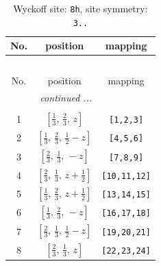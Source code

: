 \documentclass[fleqn,8pt]{jsarticle}
\begin{document}
\begin{longtable}{ccc}
\caption{Wyckoff site: {\tt 8h}, site symmetry: {\tt 3..}}
 \\
 \hline \hline
No. & position & mapping \\ \hline \endfirsthead

\multicolumn{2}{l}{\tablename\ \thetable{}} \\
 \hline \hline
No. & position & mapping \\ \hline \endhead

 \hline \hline
\multicolumn{2}{r}{\footnotesize\it continued ...} \\ \endfoot

 \hline \hline
\multicolumn{2}{r}{} \\ \endlastfoot

1 & $\left[ \frac{1}{3},\, \frac{2}{3},\, z \right]$ & {\tt [1,2,3]} \\ \hline
2 & $\left[ \frac{1}{3},\, \frac{2}{3},\, \frac{1}{2} - z \right]$ & {\tt [4,5,6]} \\ \hline
3 & $\left[ \frac{2}{3},\, \frac{1}{3},\, - z \right]$ & {\tt [7,8,9]} \\ \hline
4 & $\left[ \frac{2}{3},\, \frac{1}{3},\, z + \frac{1}{2} \right]$ & {\tt [10,11,12]} \\ \hline
5 & $\left[ \frac{1}{3},\, \frac{2}{3},\, z + \frac{1}{2} \right]$ & {\tt [13,14,15]} \\ \hline
6 & $\left[ \frac{1}{3},\, \frac{2}{3},\, - z \right]$ & {\tt [16,17,18]} \\ \hline
7 & $\left[ \frac{2}{3},\, \frac{1}{3},\, \frac{1}{2} - z \right]$ & {\tt [19,20,21]} \\ \hline
8 & $\left[ \frac{2}{3},\, \frac{1}{3},\, z \right]$ & {\tt [22,23,24]} \\
\end{longtable}
\renewcommand{\arraystretch}{1.2}
\end{document}
